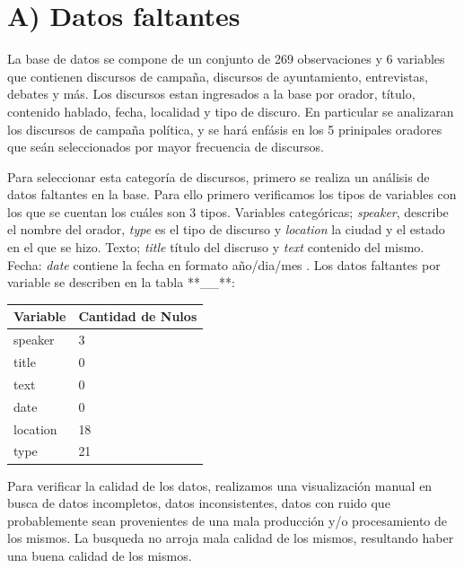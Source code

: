 \documentclass[
  letterpaper,
  DIV=11,
  numbers=noendperiod]{scrartcl}
\begin{document}
\section{A) Datos faltantes}\label{a-datos-faltantes}

La base de datos se compone de un conjunto de 269 observaciones y 6
variables que contienen discursos de campaña, discursos de ayuntamiento,
entrevistas, debates y más. Los discursos estan ingresados a la base por
orador, título, contenido hablado, fecha, localidad y tipo de discuro.
En particular se analizaran los discursos de campaña política, y se hará
enfásis en los 5 prinipales oradores que seán seleccionados por mayor
frecuencia de discursos.

Para seleccionar esta categoría de discursos, primero se realiza un
análisis de datos faltantes en la base. Para ello primero verificamos
los tipos de variables con los que se cuentan los cuáles son 3 tipos.
Variables categóricas; \emph{speaker}, describe el nombre del orador,
\emph{type} es el tipo de discurso y \emph{location} la ciudad y el
estado en el que se hizo. Texto; \emph{title} título del discruso y
\emph{text} contenido del mismo. Fecha: \emph{date} contiene la fecha en
formato año/dia/mes . Los datos faltantes por variable se describen en
la tabla **\_\_**:

\begin{longtable}[]{@{}ll@{}}
\toprule\noalign{}
Variable & Cantidad de Nulos \\
\midrule\noalign{}
\endhead
\bottomrule\noalign{}
\endlastfoot
speaker & 3 \\
title & 0 \\
text & 0 \\
date & 0 \\
location & 18 \\
type & 21 \\
\end{longtable}

Para verificar la calidad de los datos, realizamos una visualización
manual en busca de datos incompletos, datos inconsistentes, datos con
ruido que probablemente sean provenientes de una mala producción y/o
procesamiento de los mismos. La busqueda no arroja mala calidad de los
mismos, resultando haber una buena calidad de los mismos.
\end{document}
